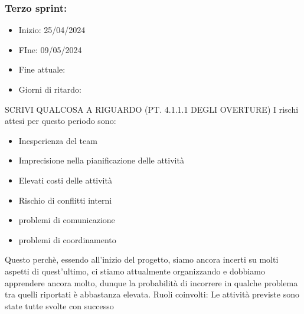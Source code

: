 \documentclass[italian,12pt]{article} %
\begin{document}
    \subsubsection{Terzo sprint:}
    \begin{itemize}
        \item Inizio: 25/04/2024
        \item FIne: 09/05/2024
        \item Fine attuale:
        \item Giorni di ritardo:
    \end{itemize}
    SCRIVI QUALCOSA A RIGUARDO (PT. 4.1.1.1 DEGLI OVERTURE)
    I rischi attesi per questo periodo sono:
    \begin{itemize}
        \item Inesperienza del team
        \item Imprecisione nella pianificazione delle attività
        \item Elevati costi delle attività
        \item Rischio di conflitti interni 
        \item problemi di comunicazione
        \item problemi di coordinamento
    \end{itemize}
    Questo perchè, essendo all’inizio del progetto, siamo ancora incerti su molti aspetti di quest’ultimo, ci stiamo attualmente organizzando e dobbiamo apprendere ancora molto, dunque la probabilità di incorrere in qualche problema tra quelli riportati è abbastanza elevata.
    Ruoli coinvolti: 
    Le attività previste sono state tutte svolte con successo
\end{document}
